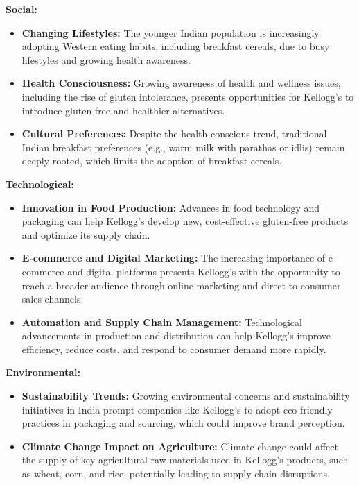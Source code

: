 \documentclass[10pt,a4paper]{book}
\begin{document}
\textbf{Social:}
\begin{itemize}
    \item \textbf{Changing Lifestyles:} The younger Indian population is increasingly adopting Western eating habits, including breakfast cereals, due to busy lifestyles and growing health awareness.
    \item \textbf{Health Consciousness:} Growing awareness of health and wellness issues, including the rise of gluten intolerance, presents opportunities for Kellogg’s to introduce gluten-free and healthier alternatives.
    \item \textbf{Cultural Preferences:} Despite the health-conscious trend, traditional Indian breakfast preferences (e.g., warm milk with parathas or idlis) remain deeply rooted, which limits the adoption of breakfast cereals.
\end{itemize}

\vspace{0.5cm}

\textbf{Technological:}
\begin{itemize}
    \item \textbf{Innovation in Food Production:} Advances in food technology and packaging can help Kellogg’s develop new, cost-effective gluten-free products and optimize its supply chain.
    \item \textbf{E-commerce and Digital Marketing:} The increasing importance of e-commerce and digital platforms presents Kellogg’s with the opportunity to reach a broader audience through online marketing and direct-to-consumer sales channels.
    \item \textbf{Automation and Supply Chain Management:} Technological advancements in production and distribution can help Kellogg’s improve efficiency, reduce costs, and respond to consumer demand more rapidly.
\end{itemize}

\vspace{0.5cm}

\textbf{Environmental:}
\begin{itemize}
    \item \textbf{Sustainability Trends:} Growing environmental concerns and sustainability initiatives in India prompt companies like Kellogg’s to adopt eco-friendly practices in packaging and sourcing, which could improve brand perception.
    \item \textbf{Climate Change Impact on Agriculture:} Climate change could affect the supply of key agricultural raw materials used in Kellogg’s products, such as wheat, corn, and rice, potentially leading to supply chain disruptions.
\end{itemize}
\end{document}
